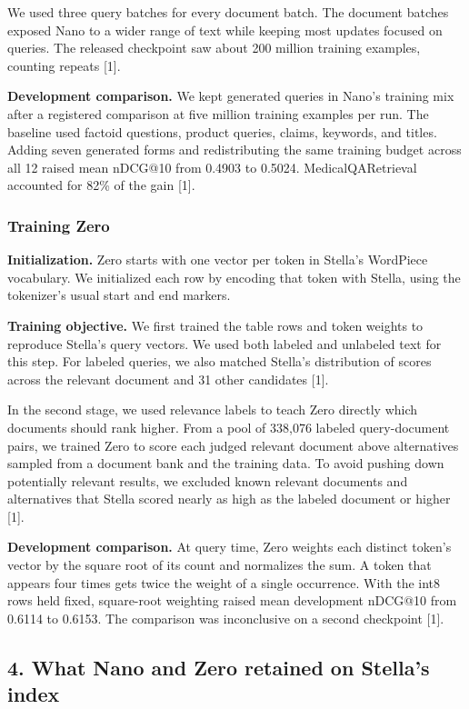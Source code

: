 \documentclass[
  english,
  10pt,
]{article}
\begin{document}
We used three query batches for every document batch. The document
batches exposed Nano to a wider range of text while keeping most updates
focused on queries. The released checkpoint saw about 200 million
training examples, counting repeats {[}1{]}.

\textbf{Development comparison.} We kept generated queries in Nano's
training mix after a registered comparison at five million training
examples per run. The baseline used factoid questions, product queries,
claims, keywords, and titles. Adding seven generated forms and
redistributing the same training budget across all 12 raised mean
nDCG@10 from 0.4903 to 0.5024. MedicalQARetrieval accounted for 82\% of
the gain {[}1{]}.

\subsubsection{Training Zero}\label{training-zero}

\textbf{Initialization.} Zero starts with one vector per token in
Stella's WordPiece vocabulary. We initialized each row by encoding that
token with Stella, using the tokenizer's usual start and end markers.

\textbf{Training objective.} We first trained the table rows and token
weights to reproduce Stella's query vectors. We used both labeled and
unlabeled text for this step. For labeled queries, we also matched
Stella's distribution of scores across the relevant document and 31
other candidates {[}1{]}.

In the second stage, we used relevance labels to teach Zero directly
which documents should rank higher. From a pool of 338,076 labeled
query-document pairs, we trained Zero to score each judged relevant
document above alternatives sampled from a document bank and the
training data. To avoid pushing down potentially relevant results, we
excluded known relevant documents and alternatives that Stella scored
nearly as high as the labeled document or higher {[}1{]}.

\textbf{Development comparison.} At query time, Zero weights each
distinct token's vector by the square root of its count and normalizes
the sum. A token that appears four times gets twice the weight of a
single occurrence. With the int8 rows held fixed, square-root weighting
raised mean development nDCG@10 from 0.6114 to 0.6153. The comparison
was inconclusive on a second checkpoint {[}1{]}.

\subsection{4. What Nano and Zero retained on Stella's
index}\label{what-nano-and-zero-retained-on-stellas-index}
\end{document}
